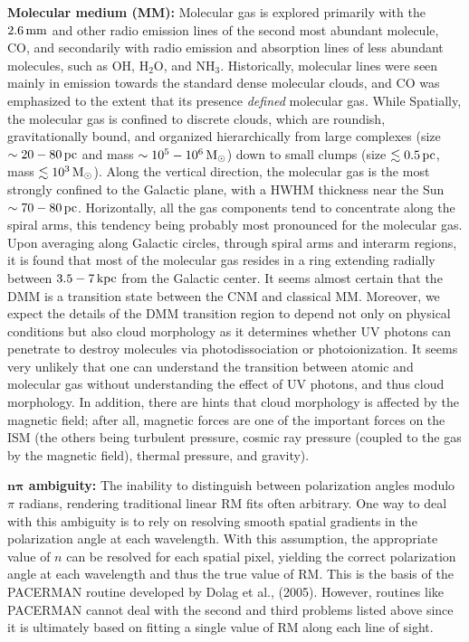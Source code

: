 \documentclass[a4paper,10pt]{article}
\begin{document}
{\noindent}\textbf{Molecular medium (MM):} Molecular gas is explored primarily with the $2.6\,{\rm mm}$ and other radio emission lines of the second most abundant molecule, CO, and secondarily with radio emission and absorption lines of less abundant molecules, such as OH, H$_2$O, and NH$_3$. Historically, molecular lines were seen mainly in emission towards the standard dense molecular clouds, and CO was emphasized to the extent that its presence \textit{defined} molecular gas. While Spatially, the molecular gas is confined to discrete clouds, which are roundish, gravitationally bound, and organized hierarchically from large complexes (size $\sim20-80\,{\rm pc}$ and mass $\sim10^5-10^6\,{\rm M_\odot}$) down to small clumps (size $\lesssim0.5\,{\rm pc}$, mass $\lesssim10^3\,{\rm M_\odot}$). Along the vertical direction, the molecular gas is the most strongly confined to the Galactic plane, with a HWHM thickness near the Sun $\sim70-80\,{\rm pc}$. Horizontally, all the gas components tend to concentrate along the spiral arms, this tendency being probably most pronounced for the molecular gas. Upon averaging along Galactic circles, through spiral arms and interarm regions, it is found that most of the molecular gas resides in a ring extending radially between $3.5-7\,{\rm kpc}$ from the Galactic center. It seems almost certain that the DMM is a transition state between the CNM and classical MM. Moreover, we expect the details of the DMM transition region to depend not only on physical conditions but also cloud morphology as it determines whether UV photons can penetrate to destroy molecules via photodissociation or photoionization. It seems very unlikely that one can understand the transition between atomic and molecular gas without understanding the effect of UV photons, and thus cloud morphology. In addition, there are hints that cloud morphology is affected by the magnetic field; after all, magnetic forces are one of the important forces on the ISM (the others being turbulent pressure, cosmic ray pressure (coupled to the gas by the magnetic field), thermal pressure, and gravity).

{\noindent}\textbf{$\mathbf{n\pi}$ ambiguity:} The inability to distinguish between polarization angles modulo $\pi$ radians, rendering traditional linear RM fits often arbitrary. One way to deal with this ambiguity is to rely on resolving smooth spatial gradients in the polarization angle at each wavelength. With this assumption, the appropriate value of $n$ can be resolved for each spatial pixel, yielding the correct polarization angle at each wavelength and thus the true value of RM. This is the basis of the PACERMAN routine developed by Dolag et al., (2005). However, routines like PACERMAN cannot deal with the second and third problems listed above since it is ultimately based on fitting a single value of RM along each line of sight. 
\end{document}
